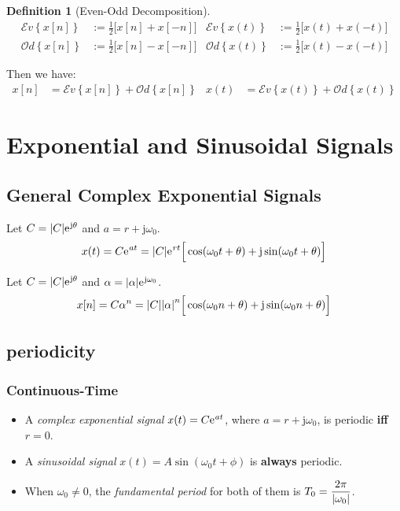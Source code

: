 \documentclass[10pt,UTF8]{article}
\newenvironment{definition box}
{\begin{tcolorbox}[colback=blue!5!white,colframe=blue!75!black,parbox=false,before upper=\par,before lower=\par]}
{\end{tcolorbox}}
\theoremstyle{definition}
\newtheorem*{definition inner}{Definition}
\newenvironment{definition}[1][]
{\begin{definition box}\begin{definition inner}[#1]\hfill\par}
{\end{definition inner}\end{definition box}}
\theoremstyle{remark}
\newcommand{\ju}{\mathrm{j}}  %
\newcommand{\e}{\mathrm{e}{\mkern 1 mu}}
\newcommand{\Ev}[1]{\mathcal{E}\textit{v}\!\left\{#1\right\}}
\newcommand{\Od}[1]{\mathcal{O}\textit{d}\!\left\{#1\right\}}
\begin{document}
\begin{definition}[Even-Odd Decomposition]
    \begin{align*}
        \Ev{x[n]} &:= \frac{1}{2} \Big[x[n] + x[-n]\Big] &
        \Ev{x(t)} &:= \frac{1}{2} \Big[x(t) + x(-t)\Big] \\
        \Od{x[n]} &:= \frac{1}{2} \Big[x[n] - x[-n]\Big] &
        \Od{x(t)} &:= \frac{1}{2} \Big[x(t) - x(-t)\Big]
    \end{align*}
\end{definition}

Then we have:
\begin{align*}
    x[n] &= \Ev{x[n]} + \Od{x[n]} &
    x(t) &= \Ev{x(t)} + \Od{x(t)} 
\end{align*}


\section{Exponential and Sinusoidal Signals}

\subsection{General Complex Exponential Signals}

Let $C = \abs{C}\e^{\ju\theta}$ and $a = r + \ju\omega_0$.
\begin{equation*}
    x(t) = C \e^{a t} = 
    \abs{C} \e^{r t}\Big[\cos(\omega_0 t+\theta)+\ju\sin(\omega_0 t+\theta)\Big]
\end{equation*}

Let $C = \abs{C}\e^{\ju\theta}$ and $\alpha = \abs{\alpha}\e^{\ju\omega_0}$.
\begin{equation*}
    x[n] = C \alpha^n = 
    \abs{C}\abs{\alpha}^n\Big[\cos(\omega_0 n+\theta)+\ju\sin(\omega_0 n+\theta)\Big]
\end{equation*}

\subsection{periodicity}

\subsubsection{Continuous-Time}

\begin{itemize}
    \item A \emph{complex exponential signal} $x(t) = C \e^{a t}$,
    where $a = r + \ju\omega_0$, is periodic \textbf{iff} $r = 0$.
    \item A \emph{sinusoidal signal} $x(t) = A\sin(\omega_0 t+\phi)$
    is \textbf{always} periodic.
    \item When $\omega_0 \ne 0$,
    the \emph{fundamental period} for both of them
    is $T_0=\dfrac{2\pi}{\abs{\omega_0}}$.
\end{itemize}
\end{document}
